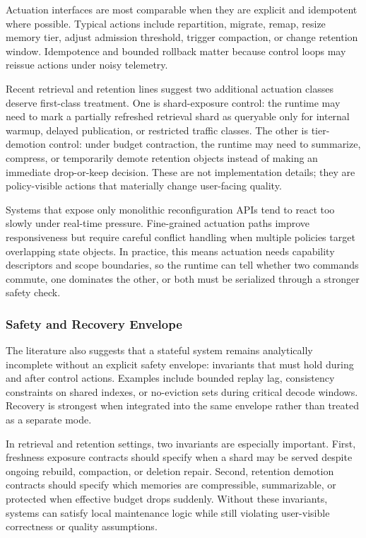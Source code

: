\documentclass[acmsmall,screen,review]{acmart}
\begin{document}
Actuation interfaces are most comparable when they are explicit and idempotent where possible. Typical actions include repartition, migrate, remap, resize memory tier, adjust admission threshold, trigger compaction, or change retention window. Idempotence and bounded rollback matter because control loops may reissue actions under noisy telemetry.

Recent retrieval and retention lines suggest two additional actuation classes deserve first-class treatment. One is shard-exposure control: the runtime may need to mark a partially refreshed retrieval shard as queryable only for internal warmup, delayed publication, or restricted traffic classes. The other is tier-demotion control: under budget contraction, the runtime may need to summarize, compress, or temporarily demote retention objects instead of making an immediate drop-or-keep decision. These are not implementation details; they are policy-visible actions that materially change user-facing quality.

Systems that expose only monolithic reconfiguration APIs tend to react too slowly under real-time pressure. Fine-grained actuation paths improve responsiveness but require careful conflict handling when multiple policies target overlapping state objects. In practice, this means actuation needs capability descriptors and scope boundaries, so the runtime can tell whether two commands commute, one dominates the other, or both must be serialized through a stronger safety check.

\subsubsection{Safety and Recovery Envelope}

The literature also suggests that a stateful system remains analytically incomplete without an explicit safety envelope: invariants that must hold during and after control actions. Examples include bounded replay lag, consistency constraints on shared indexes, or no-eviction sets during critical decode windows. Recovery is strongest when integrated into the same envelope rather than treated as a separate mode.

In retrieval and retention settings, two invariants are especially important. First, freshness exposure contracts should specify when a shard may be served despite ongoing rebuild, compaction, or deletion repair. Second, retention demotion contracts should specify which memories are compressible, summarizable, or protected when effective budget drops suddenly. Without these invariants, systems can satisfy local maintenance logic while still violating user-visible correctness or quality assumptions.
\end{document}
